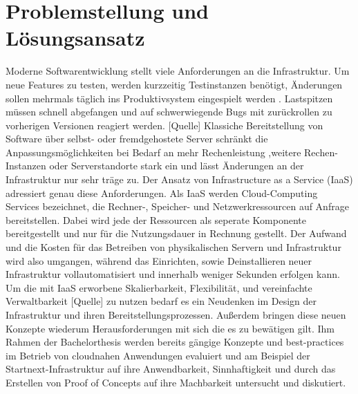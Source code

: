 \documentclass[11pt]{scrartcl}
\begin{document}
\section{\label{sec:problem_loesung}Problemstellung und Lösungsansatz}
Moderne Softwarentwicklung stellt viele Anforderungen an die Infrastruktur. Um neue Features zu testen, werden kurzzeitig Testinstanzen benötigt, Änderungen sollen mehrmals täglich ins Produktivsystem eingespielt werden \cite{IBM:2019}. Lastspitzen müssen schnell abgefangen und auf schwerwiegende Bugs mit zurückrollen zu vorherigen Versionen reagiert werden. [Quelle] Klassiche Bereitstellung von Software über selbst- oder fremdgehostete Server schränkt die Anpassungsmöglichkeiten bei Bedarf an mehr Rechenleistung ,weitere Rechen-Instanzen oder Serverstandorte stark ein und lässt Änderungen an der Infrastruktur nur sehr träge zu. \newline
Der Ansatz von Infrastructure as a Service (IaaS) adressiert genau diese Anforderungen.
Als IaaS werden Cloud-Computing Services bezeichnet, die Rechner-, Speicher- und Netzwerkressourcen auf Anfrage bereitstellen. Dabei wird jede der Ressourcen als seperate Komponente bereitgestellt und nur für die Nutzungsdauer in Rechnung gestellt. Der Aufwand und die Kosten für das Betreiben von physikalischen Servern und Infrastruktur wird also umgangen, während das Einrichten, sowie Deinstallieren neuer Infrastruktur vollautomatisiert und innerhalb weniger Sekunden erfolgen kann. Um die mit IaaS erworbene Skalierbarkeit, Flexibilität, und vereinfachte Verwaltbarkeit [Quelle] zu nutzen bedarf es ein Neudenken im Design der Infrastruktur und ihren Bereitstellungsprozessen. Außerdem bringen diese neuen Konzepte wiederum Herausforderungen mit sich die es zu bewätigen gilt. \newline 
Ihm Rahmen der Bachelorthesis werden bereits g{\"a}ngige Konzepte und \glqq best-practices\grqq{} im Betrieb von cloudnahen Anwendungen evaluiert und am Beispiel der Startnext-Infrastruktur auf ihre Anwendbarkeit, Sinnhaftigkeit und durch das Erstellen von Proof of Concepts auf ihre Machbarkeit untersucht und diskutiert. 
\pagebreak
\end{document}
